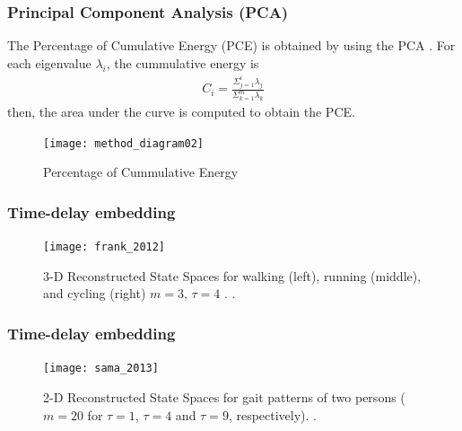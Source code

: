 \documentclass{beamer}
\begin{document}
\begin{frame}
\frametitle{Principal Component Analysis (PCA)}
\vspace{-0.7cm}

The Percentage of Cumulative Energy (PCE) is obtained by using the PCA \textcolor{red}{\textbf{ \cite{Hammerla2011} }}.
For each eigenvalue $\lambda_i$, the cummulative energy is
\begin{eqnarray*} 
C_i = \frac{ \Sigma_{j=1}^{i} \lambda_j }{ \Sigma_{k=1}^{m} \lambda_k }
\end{eqnarray*}
then, the area under the curve is computed to obtain the PCE.


\begin{figure}[!htb]
\centering    
\texttt{[image: method\_diagram02]}
\caption[PA]{Percentage of Cummulative Energy}
 \label{fig:sn}
\end{figure}


\end{frame}




\begin{frame}
\frametitle{Time-delay embedding}
\vspace{-0.7cm}


\begin{figure}[!htb]
\centering    
\texttt{[image: frank\_2012]}
\caption[PA]{3-D Reconstructed State Spaces for walking (left), running (middle), and cycling (right) $m=3$, $\tau=4$ . 
 \textcolor{red}{\textbf{ \cite{Frank2010,Frank2012} }}.
}  
\label{fig:sn}
\end{figure}

\end{frame}


\begin{frame}
\frametitle{Time-delay embedding}
\vspace{-0.7cm}



\begin{figure}[!htb]
\centering    
\texttt{[image: sama\_2013]}
\caption[PA]{2-D Reconstructed State Spaces for gait patterns of two persons ($m=20$ for $\tau=1$, $\tau=4$ and $\tau=9$, respectively). 
 \textcolor{red}{\textbf{ \cite{Sama2013} }}.
}  
\label{fig:sn}
\end{figure}



\end{frame}
\end{document}
